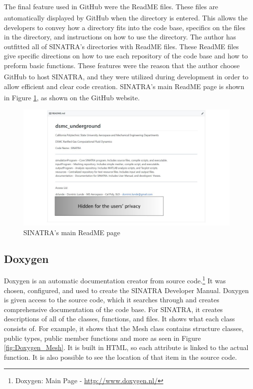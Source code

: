 \indent The final feature used in GitHub\textsuperscript{\textregistered} were the ReadME files. These files are automatically displayed by GitHub\textsuperscript{\textregistered} when the directory is entered. This allows the developers to convey how a directory fits into the code base, specifics on the files in the directory, and instructions on how to use the directory. The author has outfitted all of SINATRA's directories with ReadME files. These ReadME files give specific directions on how to use each repository of the code base and how to preform basic functions. These features were the reason that the author choose GitHub\textsuperscript{\textregistered} to host SINATRA, and they were utilized during development in order to allow efficient and clear code creation. SINATRA's main ReadME page is shown in Figure \ref{fig:readme}, as shown on the GitHub\textsuperscript{\textregistered} website. 

\begin{figure}
\includegraphics[width=.95\textwidth]{figures/Readme_redacted.png}
\centering
\caption{SINATRA's main ReadME page}
\label{fig:readme}
\end{figure}


\subsection{Doxygen}
Doxygen is an automatic documentation creator from source code.\footnote{Doxygen:  Main Page - \url{http://www.doxygen.nl/}} It was chosen, configured, and used to create the SINATRA Developer Manual. Doxygen is given access to the source code, which it searches through and creates comprehensive documentation of the code base. For SINATRA, it creates descriptions of all of the classes, functions, and files. It shows what each class consists of. For example, it shows that the Mesh class contains structure classes, public types, public member functions and more as seen in Figure \ref{fig:Doxygen_Mesh}. It is built in HTML, so each attribute is linked to the actual function. It is also possible to see the location of that item in the source code. \par

